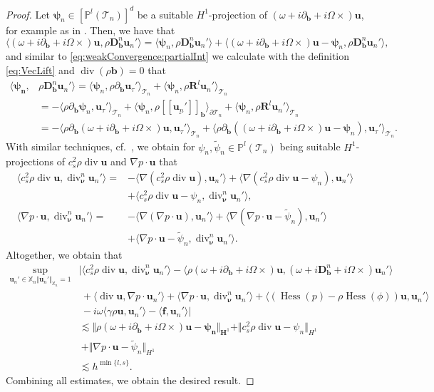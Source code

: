 \documentclass{m2an}
\newcommand{\nv}{\boldsymbol{\nu}}
\newcommand{\bflow}{\mathbf{b}}
\newcommand{\angvel}{\Omega}
\newcommand{\conv}{\partial_{\bflow}} %
\newcommand{\opd}{(\omega+i\conv+i\angvel\times)}
\newcommand{\dopd}{(\omega+i\ddiffb+i\angvel\times)}
\renewcommand{\u}{\mathbf{u}}
\renewcommand{\div}{\operatorname{div}}
\DeclareMathOperator{\hess}{Hess}
\newcommand{\calT}{\mathcal{T}}
\newcommand{\Xn}{\mathbb{X}_n}
\newcommand{\bH}{{\mathbf H}}
\newcommand{\bD}{\mathbf{D}}
\newcommand{\bRl}{\mathbf{R}^{\!l}}
\newcommand{\bff}{\mathbf{f}}
\newcommand{\hdgjump}[1]{[\![\underline{#1} ]\!]}
\newcommand{\Tn}{\calT_n}
\newcommand{\spl}{\langle}
\newcommand{\spr}{\rangle}
\newcommand{\diffb}{\partial_{\bflow}}
\newcommand{\ddiffb}{\bD_{\bflow}^n}
\newcommand{\ddiv}{\div_{\nv}^n}
\theoremstyle{plain}
\theoremstyle{definition}
\begin{document}
\begin{proof}
   Let $\bm{\psi}_n \in [\mathbb{P}^l(\Tn)]^d$ be a suitable $H^1$-projection of $\opd \u$, for example as in \cite{EG16}. Then, we have that 
   \begin{equation*}
      \spl \opd \u, \rho \ddiffb \u_n' \spr = \spl \bm{\psi}_n, \rho \ddiffb \u_n' \spr + \spl \opd \u - \bm{\psi}_n, \rho \ddiffb \u_n' \spr, 
   \end{equation*}
   and similar to \eqref{eq:weakConvergence:partialInt} we calculate with the definition \eqref{eq:VecLift} and $\div(\rho \bflow) = 0$ that  
   \begin{equation*}
      \begin{aligned}
         \spl \bm{\psi_n}, &\rho \ddiffb \u_n' \spr = \spl \bm{\psi}_n, \rho \diffb \u_\tau' \spr_{\Tn} + \spl \bm{\psi}_n, \rho \bRl \u_n' \spr_{\Tn} \\
         &= - \spl \rho \diffb \bm{\psi}_n, \u_\tau' \spr_{\Tn} + \spl \bm{\psi}_n, \rho \hdgjump{\u_n'}_{\bflow} \spr_{\partial \Tn} + \spl \bm{\psi}_n, \rho \bRl \u_n' \spr_{\Tn} \\
         &= - \spl \rho \diffb \opd \u, \u_\tau' \spr_{\Tn} + \spl  \rho \diffb  (\opd \u - \bm{\psi}_n), \u_\tau' \spr_{\Tn}. 
      \end{aligned}
   \end{equation*}
    With similar techniques, cf.~\cite[Thm.~6.26]{Thesis_vB23}, we obtain for $\psi_n, \tilde{\psi}_n \in \mathbb{P}^l(\Tn)$ being suitable $H^1$-projections of $c_s^2 \rho \div \u$ and $\nabla p \cdot \u$ that 
   \begin{align*}
      \spl c_s^2 \rho \div \u, \ddiv \u_n' \spr = &- \spl \nabla(c_s^2 \rho \div \u), \u_n' \spr + \spl \nabla(c_s^2 \rho \div \u - \psi_n), \u_n' \spr \\
      &+ \spl c_s^2 \rho \div \u - \psi_n, \ddiv \u_n' \spr, \\ 
      \spl \nabla p \cdot \u, \ddiv \u_n' \spr = &- \spl \nabla(\nabla p \cdot \u), \u_n' \spr + \spl \nabla(\nabla p \cdot \u - \tilde{\psi}_n), \u_n' \spr \\
      &+ \spl \nabla p \cdot \u - \tilde{\psi}_n, \ddiv \u_n' \spr.
   \end{align*}
   Altogether, we obtain that 
   \begin{align*}
      \sup_{\u_n' \in \Xn  \Vert \u_n' \Vert_{\Xn} = 1} &\vert \spl c_s^2 \rho \div \u, \ddiv \u_n' \spr - \spl \rho \opd \u, \dopd \u_n' \spr \\
      &\ + \spl \div \u, \nabla p \cdot \u_n' \spr \! + \! \spl \nabla p \cdot \u, \ddiv \u_n' \spr \! + \! \spl (\hess(p) - \rho \hess(\phi)) \u, \u_n' \spr \\
      &\ - i \omega \spl \gamma \rho \u, \u_n' \spr - \spl \bff, \u_n' \spr \vert \\
      &\lesssim \Vert \rho \opd \u - \bm{\psi_n} \Vert_{\bH^1} + \Vert c_s^2 \rho \div \u - \psi_n \Vert_{H^1} \\
      &\  + \Vert \nabla p \cdot \u - \tilde{\psi}_n \Vert_{H^1} \\
      &\lesssim h^{\min\{ l,s\}}. 
   \end{align*}
   Combining all estimates, we obtain the desired result.
\end{proof}
\end{document}
